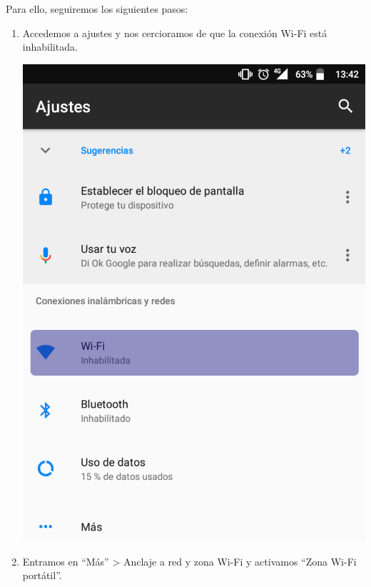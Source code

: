Para ello, seguiremos los siguientes pasos:
\begin{enumerate}
	\item Accedemos a ajustes y nos cercioramos de que la conexión Wi-Fi está inhabilitada.
	\begin{center}
			\includegraphics[scale=0.25]{1.png} 
	\end{center}
	\item Entramos en ``Más'' > Anclaje a red y zona Wi-Fi y activamos ``Zona Wi-Fi portátil''.
	\begin{center}
		\begin{tabular}{ c c }

\end{tabular}
\end{center}
\end{enumerate}
